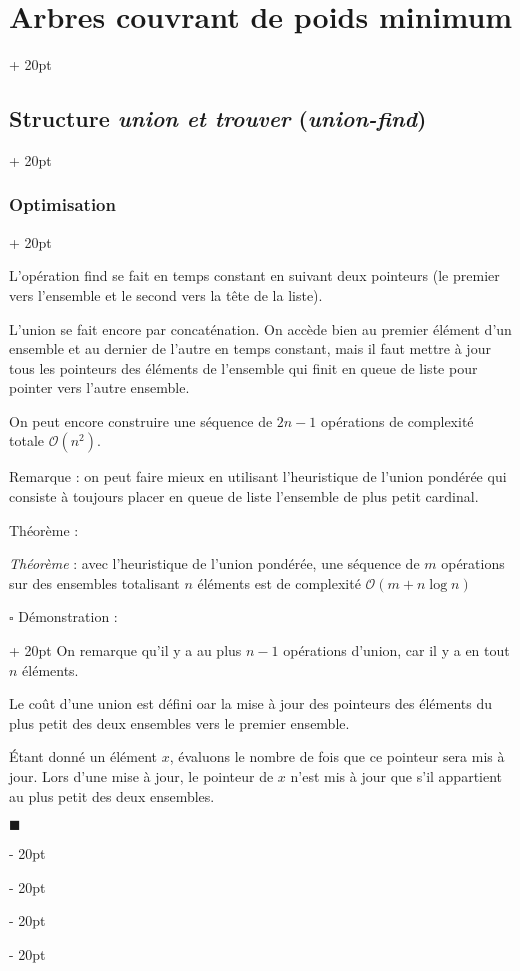 \documentclass[a4paper, 12pt, twoside]{article}
\newcommand{\ind}[1][20pt]{\advance\leftskip + #1}
\newcommand{\deind}[1][20pt]{\advance\leftskip - #1}
\newenvironment{indt}[2][20pt]{#2 \par \ind[#1]}{\par \deind} %
\newenvironment{proof}[1][{Démonstration :}]{\begin{indt}{$\square$ #1}}{$\blacksquare$ \end{indt}}
\begin{document}
\begin{indt}{\section{Arbres couvrant de poids minimum}}
\begin{indt}{\subsection{Structure \textit{union et trouver} (\textit{union-find})}}
\begin{indt}{\subsubsection{Optimisation}}
\begin{center}
                \end{center}

                L'opération find se fait en temps constant en suivant deux pointeurs (le premier vers l'ensemble et le second vers la tête de la liste).

                L'union se fait encore par concaténation. On accède bien au premier élément d'un ensemble et au dernier de l'autre en temps constant, mais il faut mettre à jour tous les pointeurs des éléments de l'ensemble qui finit en queue de liste pour pointer vers l'autre ensemble.

                 On peut encore construire une séquence de $2n - 1$ opérations de complexité totale $\mathcal O(n^2)$.

                Remarque : on peut faire mieux en utilisant l'heuristique de l'union pondérée qui consiste à toujours placer en queue de liste l'ensemble de plus petit cardinal.

                \vspace{12pt}
                
                Théorème :
                \begin{pseudocode}
                    \textit{Théorème} :
                    avec l'heuristique de l'union pondérée, une séquence de $m$ opérations sur des ensembles totalisant $n$ éléments est de complexité $\mathcal O(m + n\log n)$
                \end{pseudocode}

                \begin{proof}
                    On remarque qu'il y a au plus $n - 1$ opérations d'union, car il y a en tout $n$ éléments.

                    Le coût d'une union est défini oar la mise à jour des pointeurs des éléments du plus petit des deux ensembles vers le premier ensemble.

                    \'Etant donné un élément $x$, évaluons le nombre de fois que ce pointeur sera mis à jour.
                    Lors d'une mise à jour, le pointeur de $x$ n'est mis à jour que s'il appartient au plus petit des deux ensembles.


\end{proof}
\end{indt}
\end{indt}
\end{indt}
\end{document}
